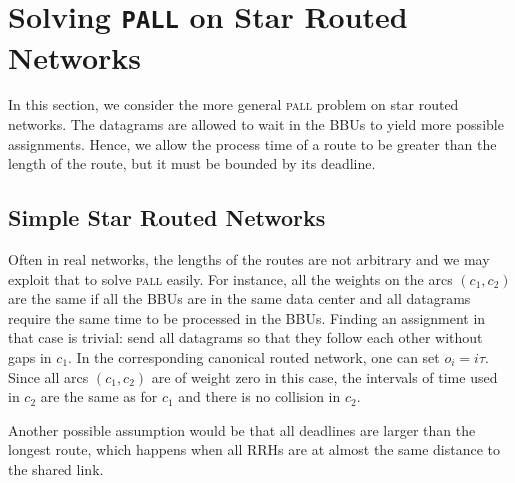 \documentclass[a4paper,10pt]{journal}
\newcommand\pall{\textsc{pall}\xspace}
\begin{document}
         \section{Solving \texttt{PALL} on Star Routed Networks}\label{sec:PALL}
    
    In this section, we consider the more general \pall problem on star routed networks. The datagrams are allowed to wait in the BBUs to yield more possible assignments. Hence, we allow the process time of a route to be greater than the length of the route, but it must be bounded by its deadline.


	\subsection{Simple Star Routed Networks}
		

	Often in real networks, the lengths of the routes are not arbitrary and we may exploit that to solve \pall easily. For instance, all the weights on the arcs $(c_1,c_2)$ are the same if all the BBUs are in the same data center and all datagrams require the same time to be processed in the BBUs.
    Finding an assignment in that case is trivial: send all datagrams so that they follow each other without gaps in $c_1$. In the corresponding canonical routed network, one can set $o_i = i\tau$.  Since all arcs $(c_1,c_2)$ are of weight zero in this case, the intervals of time used in $c_2$ are the same as for $c_1$ and there is no collision in $c_2$.

	Another possible assumption would be that all deadlines are larger than the longest route, which happens when all RRHs are at almost the same distance to the shared link.
\end{document}
